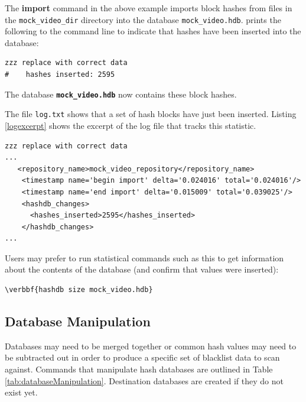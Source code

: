 \documentclass[11pt,fleqn]{article} %
\begin{document}
The \textbf{import} command in the above example imports block hashes from files in the \texttt{mock\_video\_dir} directory into the database \texttt{mock\_video.hdb}. \hdb prints the following to the command line to indicate that hashes have been inserted into the database: 

\begingroup
\footnotesize
\begin{Verbatim}[fontfamily=courier]
zzz replace with correct data
#    hashes inserted: 2595
\end{Verbatim}
\endgroup
The database \texttt{\textbf{mock\_video.hdb}} now contains these block hashes.

The file \texttt{log.txt} shows that a set of hash blocks have just been inserted. Listing \ref{logexcerpt} shows the excerpt of the log file that tracks this statistic.
\lstset{style=customfile}
\begin{lstlisting}[float, caption=Excerpt of the \texttt{log.xml} indicating hash blocks were inserted, label=logexcerpt]
zzz replace with correct data
...   
   <repository_name>mock_video_repository</repository_name>
    <timestamp name='begin import' delta='0.024016' total='0.024016'/>
    <timestamp name='end import' delta='0.015009' total='0.039025'/>
    <hashdb_changes>
      <hashes_inserted>2595</hashes_inserted>      
    </hashdb_changes>
...
\end{lstlisting}
Users may prefer to run statistical commands such as this to get information about the contents of the database (and confirm that values were inserted):
\begin{Verbatim}[commandchars=\\\{\}]
\verbbf{hashdb size mock_video.hdb}
\end{Verbatim}

\subsection{Database Manipulation}
\label{DatabaseManipulation}
Databases may need to be merged together or common hash values may need to be subtracted out in order to produce a specific set of blacklist data to scan against.
Commands that manipulate hash databases are outlined in Table \ref{tab:databaseManipulation}.
Destination databases are created if they do not exist yet.
\end{document}
